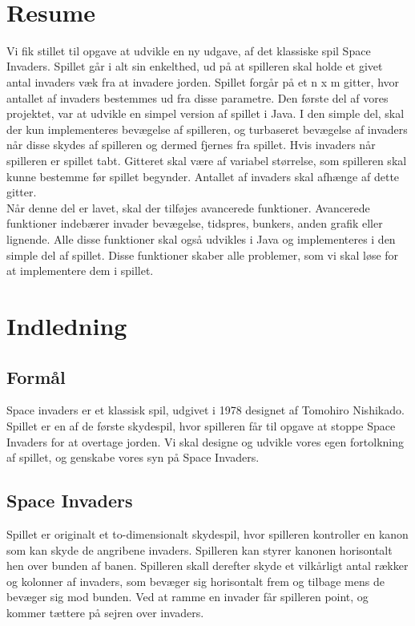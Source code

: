 \documentclass[a4paper,12pt]{article}
\title{
\HRule \\
\textsc{\doctitle} \\
	 \small{\textsl{\docsubtitle}}
\HRule
}
\author{\docauthor\\\small{\docplace}}
\date{\docdate}
\begin{document}
\maketitle
\newpage
\section{Resume}
Vi fik stillet til opgave at udvikle en ny udgave, af det klassiske spil Space Invaders. Spillet går i alt sin enkelthed, ud på at spilleren skal holde et givet antal invaders væk fra at invadere jorden. Spillet forgår på et n x m gitter, hvor antallet af invaders bestemmes ud fra disse parametre. Den første del af vores projektet, var at udvikle en simpel version af spillet i Java. I den simple del, skal der kun implementeres bevægelse af spilleren, og turbaseret bevægelse af invaders når disse skydes af spilleren og dermed fjernes fra spillet. Hvis invaders når spilleren er spillet tabt. Gitteret skal være af variabel størrelse, som spilleren skal kunne bestemme før spillet begynder. Antallet af invaders skal afhænge af dette gitter.\\
Når denne del er lavet, skal der tilføjes avancerede funktioner. Avancerede funktioner indebærer invader bevægelse, tidspres, bunkers, anden grafik eller lignende. Alle disse funktioner skal også udvikles i Java og implementeres i den simple del af spillet. Disse funktioner skaber alle problemer, som vi skal løse for at implementere dem i spillet.\\
\newpage
\tableofcontents
\newpage
\section{Indledning}
\subsection{Formål}
Space invaders er et klassisk spil, udgivet i 1978 designet af Tomohiro Nishikado. Spillet er en af de første skydespil, hvor spilleren får til opgave at stoppe Space Invaders for at overtage jorden.
Vi skal designe og udvikle vores egen fortolkning af spillet, og genskabe vores syn på Space Invaders.
\subsection{Space Invaders}
Spillet er originalt et to-dimensionalt skydespil, hvor spilleren kontroller en kanon som kan skyde de angribene invaders. Spilleren kan styrer kanonen horisontalt hen over bunden af banen. Spilleren skall derefter skyde et vilkårligt antal rækker og kolonner af invaders, som bevæger sig horisontalt frem og tilbage mens de bevæger sig mod bunden. Ved at ramme en invader får spilleren point, og kommer tættere på sejren over invaders. 
\end{document}
